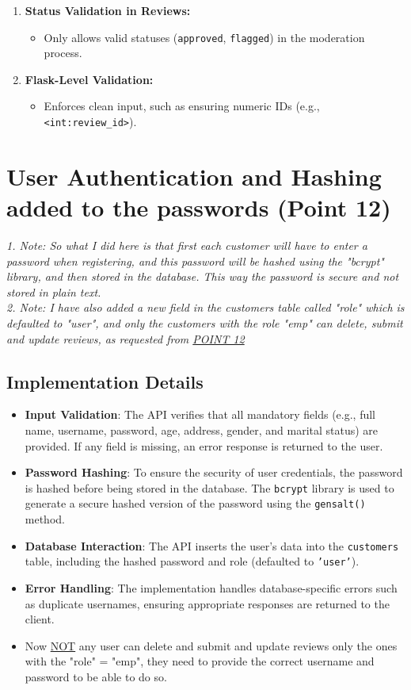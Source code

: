 \documentclass[a4paper,12pt]{article}
\begin{document}
\begin{enumerate}
    \item \textbf{Status Validation in Reviews:}
    \begin{itemize}
        \item Only allows valid statuses (\texttt{approved}, \texttt{flagged}) in the moderation process.
    \end{itemize}

    \item \textbf{Flask-Level Validation:}
    \begin{itemize}
        \item Enforces clean input, such as ensuring numeric IDs (e.g., \texttt{<int:review\_id>}).
    \end{itemize}
\end{enumerate}
\section{User Authentication and Hashing added to the passwords (Point 12)}
\textit{1. Note: So what I did here is that first each customer will have to enter a password when registering, and this password will be hashed using the "bcrypt" library, and then stored in the database. This way the password is secure and not stored in plain text.}\\
\textit{2. Note: I have also added a new field in the customers table called "role" which is defaulted to "user", and only the customers with the role "emp" can delete, submit and update reviews, as requested from \underline{POINT 12}}\\
\subsection{Implementation Details}
\begin{itemize}
    \item \textbf{Input Validation}: The API verifies that all mandatory fields (e.g., full name, username, password, age, address, gender, and marital status) are provided. If any field is missing, an error response is returned to the user.
    \item \textbf{Password Hashing}: To ensure the security of user credentials, the password is hashed before being stored in the database. The \texttt{bcrypt} library is used to generate a secure hashed version of the password using the \texttt{gensalt()} method.
    \item \textbf{Database Interaction}: The API inserts the user’s data into the \texttt{customers} table, including the hashed password and role (defaulted to \texttt{'user'}).
    \item \textbf{Error Handling}: The implementation handles database-specific errors such as duplicate usernames, ensuring appropriate responses are returned to the client.
    \item Now \underline{NOT} any user can delete and submit and update reviews only the ones with the "role" = "emp", they need to provide the correct username and password to be able to do so.
\end{itemize}
\end{document}
